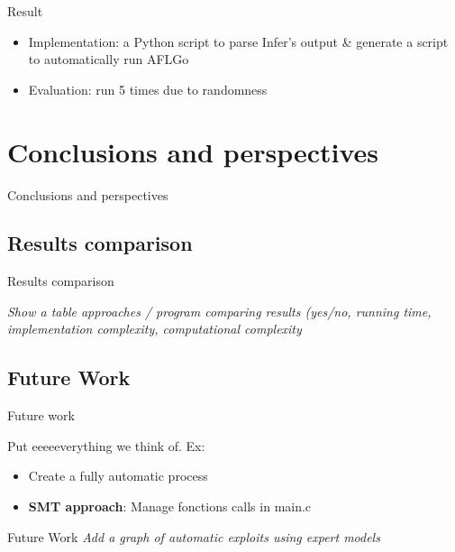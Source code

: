 \documentclass{beamer}
\begin{document}
\begin{frame}{Result}
\begin{itemize}
\item Implementation: a Python script to parse Infer's output \& generate a script to automatically run AFLGo
\item Evaluation: run 5 times due to randomness
\end{itemize}

\end{frame}


\section{Conclusions and perspectives}

\begin{frame}
\centering
\LARGE Conclusions and perspectives
\end{frame}

\subsection{Results comparison}

\begin{frame}{Results comparison}

\textit{Show a table approaches / program comparing results (yes/no, running time, implementation complexity, computational complexity } \\

\end{frame}

\subsection{Future Work}
\begin{frame}{Future work}

Put eeeeeverything we think of. Ex:

\begin{itemize}
\item Create a fully automatic process
\item \textbf{SMT approach}: Manage fonctions calls in main.c 
\end{itemize}

\end{frame}

\begin{frame}{Future Work}
\textit{Add a graph of automatic exploits using expert models}
\end{frame}
\end{document}
